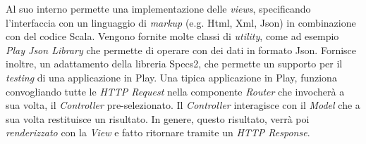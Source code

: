 Al suo interno permette una implementazione delle \emph{views}, specificando l'interfaccia con un linguaggio di \emph{markup} (e.g. Html, Xml, Json) in combinazione con del codice Scala. Vengono fornite molte classi di \emph{utility}, come ad esempio \emph{Play Json Library} che permette di operare con dei dati in formato Json. Fornisce inoltre, un adattamento della libreria Specs2, che permette un supporto per il \emph{testing} di una applicazione in Play. Una tipica applicazione in Play, funziona convogliando tutte le \emph{HTTP Request} nella componente \emph{Router} che invocherà a sua volta, il \emph{Controller} pre-selezionato. Il \emph{Controller} interagisce con il \emph{Model} che a sua volta restituisce un risultato. In genere, questo risultato, verrà poi \emph{renderizzato} con la \emph{View} e fatto ritornare tramite un \emph{HTTP Response}.
